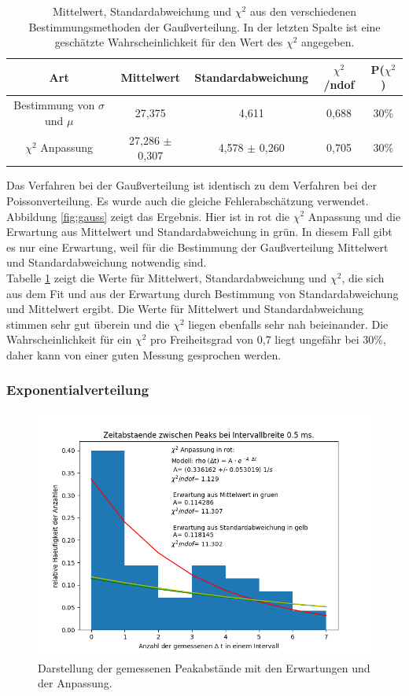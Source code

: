 \documentclass[12pt,a4paper]{article}
\begin{document}
\begin{table}
\centering
\begin{tabular}{|c|c|c|c|c|}
\hline 
Art & Mittelwert & Standardabweichung & $\chi ^2$ /ndof & P($\chi ^2$) \\ 
\hline 
Bestimmung von $\sigma$ und $\mu$ & 27,375 & 4,611 & 0,688 & 30\% \\ 
\hline 
$\chi ^2$ Anpassung & 27,286 $\pm$ 0,307 & 4,578 $\pm$ 0,260 & 0,705 & 30\% \\ 
\hline 
\end{tabular} 
\caption{Mittelwert, Standardabweichung und $\chi ^2$ aus den verschiedenen Bestimmungsmethoden der Gaußverteilung. In der letzten Spalte ist eine geschätzte Wahrscheinlichkeit für den Wert des $\chi ^2$ angegeben.}
\label{tab:Gauss}
\end{table}

Das Verfahren bei der Gaußverteilung ist identisch zu dem Verfahren bei der Poissonverteilung. Es wurde auch die gleiche Fehlerabschätzung verwendet. Abbildung \ref{fig:gauss} zeigt das Ergebnis. Hier ist in rot die $\chi ^2$ Anpassung und die Erwartung aus Mittelwert und Standardabweichung in grün. In diesem Fall gibt es nur eine Erwartung, weil für die Bestimmung der Gaußverteilung Mittelwert und Standardabweichung notwendig sind.\\
Tabelle \ref{tab:Gauss} zeigt die Werte für Mittelwert, Standardabweichung und $\chi ^2$, die sich aus dem Fit und aus der Erwartung durch Bestimmung von Standardabweichung und Mittelwert ergibt. Die Werte für Mittelwert und Standardabweichung stimmen sehr gut überein und die $\chi ^2$ liegen ebenfalls sehr nah beieinander. Die Wahrscheinlichkeit für ein $\chi ^2$ pro Freiheitsgrad von 0,7 liegt ungefähr bei 30\%, daher kann von einer guten Messung gesprochen werden.


\subsubsection{Exponentialverteilung}
\begin{figure}
\centering
\includegraphics[scale=0.8]{Bilder/Peakabstaende.PNG}
\caption{Darstellung der gemessenen Peakabstände mit den Erwartungen und der Anpassung.}
\label{fig:exponential}
\end{figure}
\end{document}
